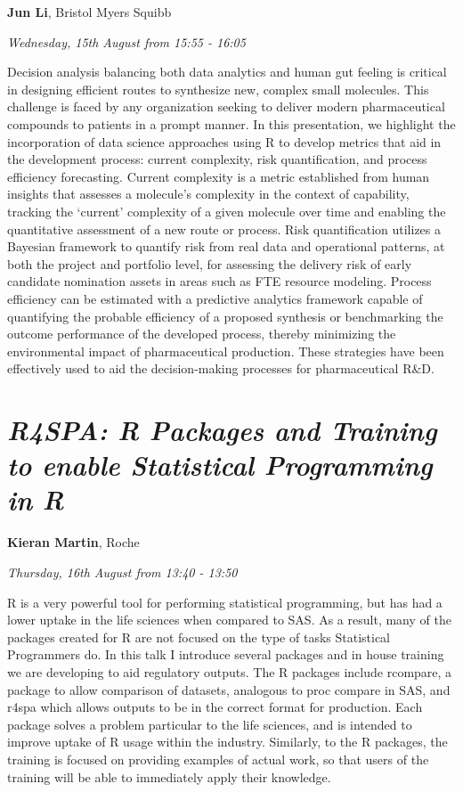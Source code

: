 \documentclass[]{book}
\theoremstyle{definition}
\theoremstyle{definition}
\theoremstyle{definition}
\theoremstyle{remark}
\begin{document}
\textbf{Jun Li}, Bristol Myers Squibb

\emph{Wednesday, 15th August from 15:55 - 16:05}

Decision analysis balancing both data analytics and human gut feeling is
critical in designing efficient routes to synthesize new, complex small
molecules. This challenge is faced by any organization seeking to
deliver modern pharmaceutical compounds to patients in a prompt manner.
In this presentation, we highlight the incorporation of data science
approaches using R to develop metrics that aid in the development
process: current complexity, risk quantification, and process efficiency
forecasting. Current complexity is a metric established from human
insights that assesses a molecule's complexity in the context of
capability, tracking the `current' complexity of a given molecule over
time and enabling the quantitative assessment of a new route or process.
Risk quantification utilizes a Bayesian framework to quantify risk from
real data and operational patterns, at both the project and portfolio
level, for assessing the delivery risk of early candidate nomination
assets in areas such as FTE resource modeling. Process efficiency can be
estimated with a predictive analytics framework capable of quantifying
the probable efficiency of a proposed synthesis or benchmarking the
outcome performance of the developed process, thereby minimizing the
environmental impact of pharmaceutical production. These strategies have
been effectively used to aid the decision-making processes for
pharmaceutical R\&D.

\hypertarget{r4spa-r-packages-and-training-to-enable-statistical-programming-in-r}{%
\section{\texorpdfstring{\emph{R4SPA: R Packages and Training to enable
Statistical Programming in
R}}{R4SPA: R Packages and Training to enable Statistical Programming in R}}\label{r4spa-r-packages-and-training-to-enable-statistical-programming-in-r}}

\textbf{Kieran Martin}, Roche

\emph{Thursday, 16th August from 13:40 - 13:50}

R is a very powerful tool for performing statistical programming, but
has had a lower uptake in the life sciences when compared to SAS. As a
result, many of the packages created for R are not focused on the type
of tasks Statistical Programmers do. In this talk I introduce several
packages and in house training we are developing to aid regulatory
outputs. The R packages include rcompare, a package to allow comparison
of datasets, analogous to proc compare in SAS, and r4spa which allows
outputs to be in the correct format for production. Each package solves
a problem particular to the life sciences, and is intended to improve
uptake of R usage within the industry. Similarly, to the R packages, the
training is focused on providing examples of actual work, so that users
of the training will be able to immediately apply their knowledge.
\end{document}
